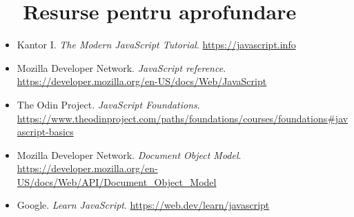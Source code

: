 \section*{\faGraduationCap\ \ Resurse pentru aprofundare}

\begin{itemize}[itemsep=2pt]
  \item Kantor I. \emph{The Modern JavaScript Tutorial}. \url{https://javascript.info}
  \item Mozilla Developer Network. \emph{JavaScript reference}. \\\url{https://developer.mozilla.org/en-US/docs/Web/JavaScript}
  \item The Odin Project. \emph{JavaScript Foundations}. \\\url{https://www.theodinproject.com/paths/foundations/courses/foundations\#javascript-basics}
  \item Mozilla Developer Network. \emph{Document Object Model}. \\\url{https://developer.mozilla.org/en-US/docs/Web/API/Document_Object_Model}
  \item Google. \emph{Learn JavaScript}. \url{https://web.dev/learn/javascript}
\end{itemize}

\bigskip

